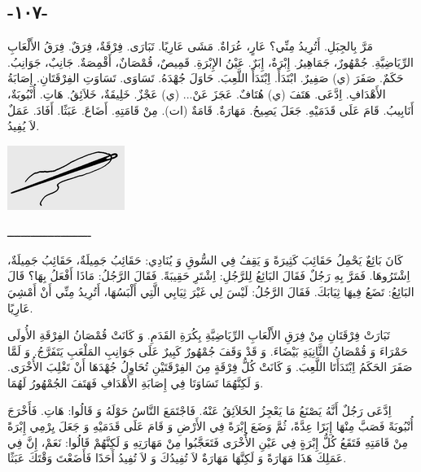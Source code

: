 \documentclass[a5paper]{article}
\begin{document}
\subsection{-١٠٧-}
مَرَّ بِالجِبَلِ. أَتُرِيدُ مِنِّي؟ عَارٍ، عُرَاةٌ. مَشَى عَارِيًا. تَبَارَى. فِرْقَةٌ، فِرَقٌ. فِرَقُ الأَلْعَابِ الرِّيَاضِيَّةِ. جُمْهُورٌ، جَمَاهِيرُ. إِبْرَةٌ، إِبَرٌ.\newline
عَيْنُ الإِبْرَةِ. قَمِيصٌ، قُمْصَانٌ، أَقْمِصَةٌ. جَانِبٌ، جَوَانِبُ. حَكَمٌ. صَفَرَ (ي) صَفِيرٌ. ابْتَدَأَ. اِبْتَدَأَ اللَّعِبَ. حَاوَلَ جُهْدَهُ. تَسَاوَى. تَسَاوَتِ الفِرْقَتَانِ. إِصَابَةُ الأَهْدَافِ. اِدَّعَى. هَتَفَ (ي) هُتَافٌ. عَجَزَ عَنْ... (ي) عَجْزٌ. خَلِيقَةٌ، خَلاَئِقُ. هَاتِ. أُنْبُوبَةٌ، أَنَابِيبُ. قَامَ عَلَى قَدَمَيْهِ. جَعَلَ يَصِيحُ. مَهَارَةٌ. قَامَةٌ (ات). مِنْ قَامَتِهِ. أَضَاعَ. عَبَثًا. أَفَادَ. عَمَلٌ لاَ يُفِيدُ.

\begin{center}
\includegraphics[width=1.5in,height=0.8209in]{MuhammadBagauddinlatinized-img280.png}
\end{center}
ـــــــــــــــــــــــــ

كَانَ بَائِعٌ يَحْمِلُ حَقَائِبَ كَثِيرَةً وَ يَقِفُ فِي السُّوقِ وَ يُنَادِي: حَقَائِبُ جَمِيلَةٌ، حَقَائِبُ جَمِيلَةٌ، اِشْتَرُوهَا. فَمَرَّ بِهِ رَجُلٌ فَقَالَ البَائِعُ لِلرَّجُلِ: اِشْتَرِ حَقِيبَةً. فَقَالَ الرَّجُلُ: مَاذَا أَفْعَلُ بِهَا؟ قَالَ البَائِعُ: تَضَعُ فِيهَا ثِيَابَكَ. فَقَالَ الرَّجُلُ: لَيْسَ لِي غَيْرَ ثِيَابِي الَّتِي أَلْبَسُهَا، أَتُرِيدُ مِنِّي أَنْ أَمْشِيَ عَارِيًا. 

تَبَارَتْ فِرْقَتَانِ مِنْ فِرَقِ الأَلْعَابِ الرِّيَاضِيَّةِ بِكُرَةِ القَدَمِ. وَ كَانَتْ قُمْصَانُ الفِرْقَةِ الأُولَى حَمْرَاءَ وَ قُمْصَانُ الثَّانِيَةِ بَيْضَاءَ. وَ قَدْ وَقَفَ جُمْهُورٌ كَبِيرٌ عَلَى جَوَانِبِ المَلْعَبِ يَتَفَرَّجُ. وَ لَمَّا صَفَرَ الحَكَمُ اِبْتَدَأَتَا اللَّعِبَ. وَ كَانَتْ كُلُّ فِرْقَةٍ مِنَ الفِرْقَتَيْنِ تُحَاوِلُ جُهْدَهَا أَنْ تَغْلِبَ الأُخْرَى. وَ لَكِنَّهُمَا تَسَاوَتَا فِي إِصَابَةِ الأَهْدَافِ فَهَتَفَ الجُمْهُورُ لَهُمَا.

اِدَّعَى رَجُلٌ أَنَّهُ يَصْنَعُ مَا يَعْجِزُ الخَلاَئِقُ عَنْهُ. فَاجْتَمَعَ النَّاسُ حَوْلَهُ وَ قَالُوا: هَاتِ. فَأَخْرَجَ أُنْبُوبَةً فَصَبَّ مِنْهَا إِبَرًا عِدَّةً، ثُمَّ وَضَعَ إِبْرَةً فِي الأَرْضِ وَ قَامَ عَلَى قَدَمَيْهِ وَ جَعَلَ يِرْمِي إِبْرَةً مِنْ قَامَتِهِ فَتَقَعُ كُلُّ إِبْرَةٍ فِي عَيْنِ الأُخْرَى فَتَعَجَّبُوا مِنْ مَهَارَتِهِ وَ لَكِنَّهُمْ قَالُوا: نَعَمْ، إِنَّ فِي عَمَلِكَ هَذَا مَهَارَةً وَ لَكِنَّهَا مَهَارَةٌ لاَ تُفِيدُكَ وَ لاَ تُفِيدُ أَحَدًا فَأَضَعْتَ وَقْتَكَ عَبَثًا.
\end{document}

